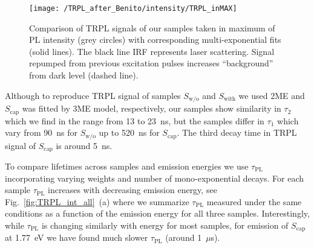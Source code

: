 
\begin{figure}[!ht]
	\centering
	\texttt{[image: /TRPL\_after\_Benito/intensity/TRPL\_inMAX]}
	\caption{Comparison of TRPL signals of our samples taken in maximum of PL intensity (grey circles) with corresponding multi-exponential fits (solid lines). The black line IRF represents laser scattering. Signal repumped from previous excitation pulses increases \enquote{background} from dark level (dashed line).}
	\label{fig:TRPL_int_all_max}
\end{figure}

%
%

%
Although to reproduce TRPL signal of samples $S_\mathrm{w/o}$ and $S_\mathrm{with}$ we used 2ME and $S_\mathrm{cap}$ was fitted by 3ME model, respectively, our samples show similarity in $\tau_2$ which we find in the range from 13 to 23~ns, but the samples differ in $\tau_1$ which vary from 90~ns for $S_\mathrm{w/o}$ up to 520~ns for $S_\mathrm{cap}$. The third decay time in TRPL signal of $S_\mathrm{cap}$ is around 5~ns.

To compare lifetimes across samples and emission energies we use $\tau_\mathrm{PL}$ incorporating varying weights and number of mono-exponential decays. For each sample $\tau_\mathrm{PL}$ increases with decreasing emission energy, see Fig.~\ref{fig:TRPL_int_all}~(a) where we summarize $\tau_\mathrm{PL}$ measured under the same conditions as a function of the emission energy for all three samples. Interestingly, while $\tau_\mathrm{PL}$ is changing similarly with energy for most samples, for emission of $S_\mathrm{cap}$ at 1.77~eV we have found much slower $\tau_\mathrm{PL}$ (around 1~$\mu$s).

